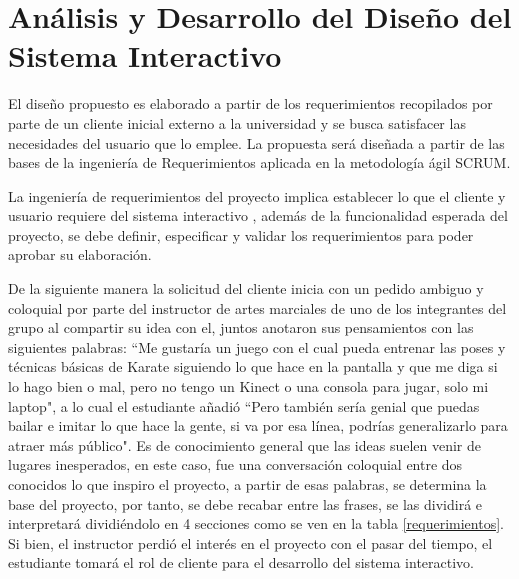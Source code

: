 \chapter{Análisis y Desarrollo del Diseño del Sistema Interactivo}

El diseño propuesto es elaborado a partir de los requerimientos recopilados por parte de un cliente inicial externo a la universidad y se busca satisfacer las necesidades del usuario que lo emplee. La propuesta será diseñada a partir de las bases de la ingeniería de Requerimientos aplicada en la metodología ágil SCRUM.

La ingeniería de requerimientos del proyecto implica establecer lo que el cliente y usuario requiere del sistema interactivo \cite{scrumdiapo}, además de la funcionalidad esperada del proyecto, se debe definir, especificar y validar los requerimientos para poder aprobar su elaboración.

De la siguiente manera la solicitud del cliente inicia con un pedido ambiguo y coloquial por parte del instructor de artes marciales de uno de los integrantes del grupo al compartir su idea con el, juntos anotaron sus pensamientos con las siguientes palabras: ``Me gustaría un juego con el cual pueda entrenar las poses y técnicas básicas de Karate siguiendo lo que hace en la pantalla y que me diga si lo hago bien o mal, pero no tengo un Kinect o una consola para jugar, solo mi laptop", a lo cual el estudiante añadió ``Pero también sería genial que puedas bailar e imitar lo que hace la gente, si va por esa línea, podrías generalizarlo para atraer más público". Es de conocimiento general que las ideas suelen venir de lugares inesperados, en este caso, fue una conversación coloquial entre dos conocidos lo que inspiro el proyecto, a partir de esas palabras, se determina la base del proyecto, por tanto, se debe recabar entre las frases, se las dividirá e interpretará dividiéndolo en 4 secciones como se ven en la tabla \ref{requerimientos}. Si bien, el instructor perdió el interés en el proyecto con el pasar del tiempo, el estudiante tomará el rol de cliente para el desarrollo del sistema interactivo.


